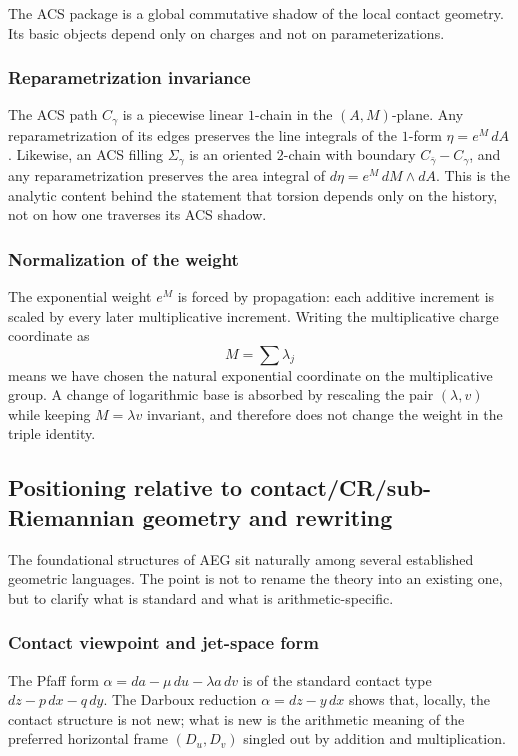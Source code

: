 The ACS package is a global commutative shadow of the local contact geometry. Its basic objects depend only on charges and not on parameterizations.

\subsubsection*{Reparametrization invariance}
The ACS path $C_\gamma$ is a piecewise linear $1$-chain in the $(A,M)$-plane. Any reparametrization of its edges preserves the line integrals of the $1$-form $\eta=e^M\,dA$. Likewise, an ACS filling $\Sigma_\gamma$ is an oriented $2$-chain with boundary $C_{\bar\gamma}-C_\gamma$, and any reparametrization preserves the area integral of $d\eta=e^M\,dM\wedge dA$. This is the analytic content behind the statement that torsion depends only on the history, not on how one traverses its ACS shadow.

\subsubsection*{Normalization of the weight}
The exponential weight $e^M$ is forced by propagation: each additive increment is scaled by every later multiplicative increment. Writing the multiplicative charge coordinate as
\[
M=\sum \lambda_j
\]
means we have chosen the natural exponential coordinate on the multiplicative group. A change of logarithmic base is absorbed by rescaling the pair $(\lambda,v)$ while keeping $M=\lambda v$ invariant, and therefore does not change the weight in the triple identity.

\subsection{Positioning relative to contact/CR/sub-Riemannian geometry and rewriting}\label{subsec:inv-positioning}

The foundational structures of AEG sit naturally among several established geometric languages. The point is not to rename the theory into an existing one, but to clarify what is standard and what is arithmetic-specific.

\subsubsection*{Contact viewpoint and jet-space form}
The Pfaff form $\alpha=da-\mu\,du-\lambda a\,dv$ is of the standard contact type $dz-p\,dx-q\,dy$. The Darboux reduction $\alpha=dz-y\,dx$ shows that, locally, the contact structure is not new; what is new is the arithmetic meaning of the preferred horizontal frame $(D_u,D_v)$ singled out by addition and multiplication.

